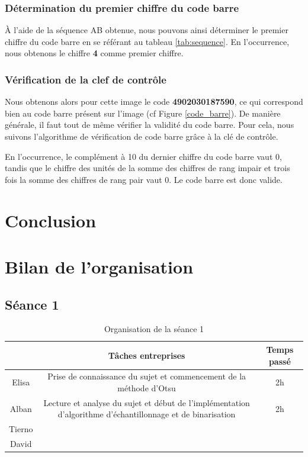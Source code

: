 \documentclass{rapport}
\begin{document}
\subsubsection*{Détermination du premier chiffre du code barre}
À l'aide de la séquence AB obtenue, nous pouvons ainsi déterminer le premier chiffre du code barre en se référant au tableau \ref{tab:sequence}.
En l'occurrence, nous obtenons le chiffre \textbf{4} comme premier chiffre. 

\subsubsection*{Vérification de la clef de contrôle}
Nous obtenons alors pour cette image le code \textbf{4902030187590}, ce qui correspond bien au code barre présent sur l'image (cf Figure \ref{code_barre}).
De manière générale, il faut tout de même vérifier la validité du code barre. Pour cela, nous suivons l'algorithme de vérification de code barre grâce à la clé de contrôle.

En l'occurrence, le complément à 10 du dernier chiffre du code barre vaut 0, tandis que le chiffre des unités de la somme des chiffres de rang impair et trois fois la somme des chiffres de rang pair vaut 0. 
Le code barre est donc valide.


\newpage 

\section{Conclusion}

\section{Bilan de l'organisation}

\subsection{Séance 1}

\begin{table}[H]
	\centering 
	\begin{tabular}{c|c|c}
		& Tâches entreprises& Temps passé\\ \hline
		Elisa& Prise de connaissance du sujet et commencement de la méthode d'Otsu& 2h\\ \hline
		Alban& Lecture et analyse du sujet et début de l'implémentation d'algorithme d'échantillonnage et de binarisation& 2h\\ \hline
		Tierno& & \\ \hline
		David& & 
	\end{tabular}
	\caption{Organisation de la séance 1}
\end{table}
\end{document}
